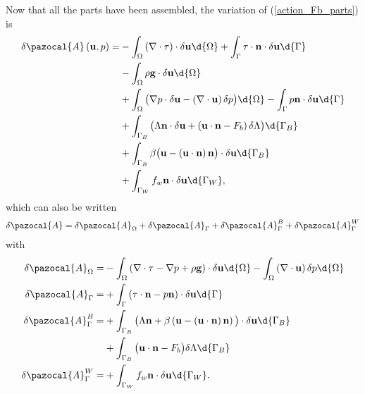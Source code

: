 Now that all the parts have been assembled, the variation of (\ref{action_Fb_parts}) is
\begin{align*}
  \delta \pazocal{A} \left(\mathbf{u}, p\right) =
  &- \int_{\Omega} \left( \nabla \cdot \tau \right) \cdot \delta \mathbf{u} \d{\Omega} + \int_{\Gamma} \tau \cdot \mathbf{n} \cdot \delta \mathbf{u} \d{\Gamma} \\
  &- \int_{\Omega} \rho \mathbf{g} \cdot \delta \mathbf{u} \d{\Omega} \\
  &+ \int_{\Omega} \big( \nabla p \cdot \delta \mathbf{u} - \left( \nabla \cdot \mathbf{u} \right) \delta p  \big) \d{\Omega} - \int_{\Gamma} p \mathbf{n} \cdot \delta \mathbf{u} \d{\Gamma} \\
  &+ \int_{\Gamma_B} \big( \Lambda \mathbf{n} \cdot \delta \mathbf{u} + \left( \mathbf{u} \cdot \mathbf{n} - F_b \right) \delta \Lambda \big) \d{\Gamma_B} \\
  &+ \int_{\Gamma_B} \beta \big( \mathbf{u} - \left( \mathbf{u} \cdot \mathbf{n} \right) \mathbf{n} \big) \cdot \delta \mathbf{u} \d{\Gamma_B} \\
  &+ \int_{\Gamma_W} f_w \mathbf{n} \cdot \delta \mathbf{u} \d{\Gamma_W},
\end{align*}
which can also be written
\begin{align}
  \label{action_variation_Fb}
  \delta \pazocal{A} =
    \delta \pazocal{A}_{\Omega} 
  + \delta \pazocal{A}_{\Gamma} 
  + \delta \pazocal{A}_{\Gamma}^B 
  + \delta \pazocal{A}_{\Gamma}^W 
\end{align}
with
\begin{align*}
  \delta \pazocal{A}_{\Omega}   = &- \int_{\Omega} \left( \nabla \cdot \tau - \nabla p + \rho \mathbf{g} \right) \cdot \delta \mathbf{u} \d{\Omega} - \int_{\Omega} \left( \nabla \cdot \mathbf{u} \right) \delta p \d{\Omega} \\ 
  \delta \pazocal{A}_{\Gamma}   = &+ \int_{\Gamma} \left( \tau \cdot \mathbf{n} - p \mathbf{n} \right) \cdot \delta \mathbf{u} \d{\Gamma} \\
  \delta \pazocal{A}_{\Gamma}^B = &+ \int_{\Gamma_B} \big( \Lambda \mathbf{n} + \beta \left( \mathbf{u} - \left( \mathbf{u} \cdot \mathbf{n} \right) \mathbf{n} \right) \big) \cdot \delta \mathbf{u} \d{\Gamma_B} \\
  &+ \int_{\Gamma_B} \big( \mathbf{u} \cdot \mathbf{n} - F_b \big) \delta \Lambda \d{\Gamma_B} \\
  \delta \pazocal{A}_{\Gamma}^W = &+ \int_{\Gamma_W} f_w \mathbf{n} \cdot \delta \mathbf{u} \d{\Gamma_W}.
\end{align*}
